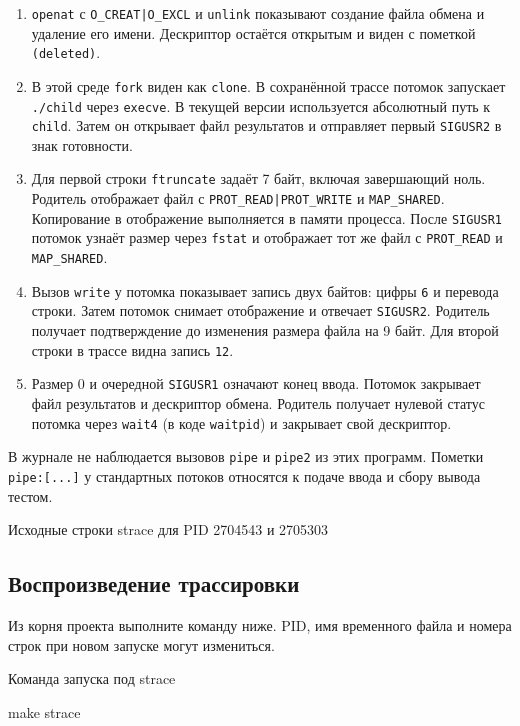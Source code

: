 \documentclass[12pt,a4paper]{article}
\begin{document}
\begin{enumerate}
\item \texttt{openat} с \texttt{O\_CREAT|O\_EXCL} и \texttt{unlink} показывают создание файла обмена и удаление его имени. Дескриптор остаётся открытым и виден с пометкой \texttt{(deleted)}.
\item В этой среде \texttt{fork} виден как \texttt{clone}. В сохранённой трассе потомок запускает \texttt{./child} через \texttt{execve}. В текущей версии используется абсолютный путь к \texttt{child}. Затем он открывает файл результатов и отправляет первый \texttt{SIGUSR2} в знак готовности.
\item Для первой строки \texttt{ftruncate} задаёт 7 байт, включая завершающий ноль. Родитель отображает файл с \texttt{PROT\_READ|PROT\_WRITE} и \texttt{MAP\_SHARED}. Копирование в отображение выполняется в памяти процесса. После \texttt{SIGUSR1} потомок узнаёт размер через \texttt{fstat} и отображает тот же файл с \texttt{PROT\_READ} и \texttt{MAP\_SHARED}.
\item Вызов \texttt{write} у потомка показывает запись двух байтов: цифры \texttt{6} и перевода строки. Затем потомок снимает отображение и отвечает \texttt{SIGUSR2}. Родитель получает подтверждение до изменения размера файла на 9 байт. Для второй строки в трассе видна запись \texttt{12}.
\item Размер 0 и очередной \texttt{SIGUSR1} означают конец ввода. Потомок закрывает файл результатов и дескриптор обмена. Родитель получает нулевой статус потомка через \texttt{wait4} (в коде \texttt{waitpid}) и закрывает свой дескриптор.
\end{enumerate}

В журнале не наблюдается вызовов \texttt{pipe} и \texttt{pipe2} из этих программ. Пометки \texttt{pipe:[...]} у стандартных потоков относятся к подаче ввода и сбору вывода тестом.

\begin{listingblock}{Исходные строки strace для PID 2704543 и 2705303}
\end{listingblock}

\subsection{Воспроизведение трассировки}

Из корня проекта выполните команду ниже. PID, имя временного файла и номера строк при новом запуске могут измениться.

\begin{listingblock}{Команда запуска под strace}
\begin{terminal}
make strace
\end{terminal}
\end{listingblock}
\end{document}
